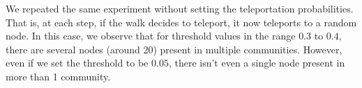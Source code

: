 \documentclass{article}
\begin{document}
We repeated the same experiment without setting the teleportation probabilities. That is, at each step,
if the walk decides to teleport, it now teleports to a random node. In this case, we observe that for threshold 
values in the range $0.3$ to $0.4$, there are several nodes (around 20) present in multiple communities. However,
even if we set the threshold to be $0.05$, there isn't even a single node present in more than 1 community.
\end{document}
